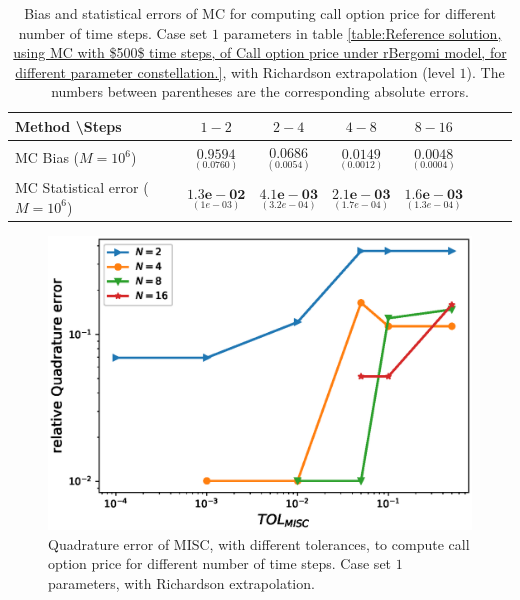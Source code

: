 \begin{table}[h!]
	\centering
	\begin{tabular}{l*{6}{c}r}
		Method \textbackslash  Steps            & $1-2$ & $2-4$ & $4-8$ & $8-16$  \\
		\hline
		MC Bias ($M=10^6$)  &$\underset{( 0.0760)}{\mathbf{0.9594}}$  & $\underset{( 0.0054)}{\mathbf{0.0686}}$  & $\underset{(   0.0012)}{\mathbf{0.0149}}$  & $\underset{(  0.0004)}{\mathbf{0.0048}}$ \\	
		
		MC Statistical error ($M=10^6$)   & $\underset{( 1e-03)}{\mathbf{1.3e-02}}$  & $\underset{(   3.2e-04)}{\mathbf{4.1e-03}}$  & $\underset{(  1.7e-04)}{\mathbf{2.1e-03}}$ & $\underset{(  1.3e-04)}{\mathbf{1.6e-03}}$ \\	
		\hline
	\end{tabular}
	\caption{Bias and statistical errors of MC   for computing call option price  for different number of time steps. Case set $1$ parameters in table \ref{table:Reference solution, using MC with $500$ time steps, of Call option price under rBergomi model, for different parameter constellation.}, with Richardson extrapolation (level $1$). The numbers between parentheses are the corresponding absolute errors.}
	\label{Bias and Statistical errors of MC ($M=10^6$)  for computing Call option price  for different number of time steps. Case set $2$ parameters, with Richardson extrapolation (level1). The numbers between parentheses are the corresponding absolute errors.}
\end{table}


\FloatBarrier





\begin{figure}[h!]
	\centering
	\includegraphics[width=0.35\linewidth]{./figures/rBergomi_MISC_quadratre_error/vs_TOL/set2/relative_quad_error_wrt_MISC_TOL_set2_with_rich_linear}
	
	
	\caption{Quadrature error of MISC, with different tolerances,  to compute call option price for different number of time steps. Case  set $1$ parameters, with Richardson extrapolation.}
	
	\label{fig:Quadrature_error_set2_linear_rich}
\end{figure}


